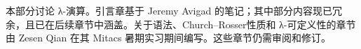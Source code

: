 \documentclass[../../include/open-logic-part]{subfiles}
\begin{document}

\begin{editorial}
本部分讨论 λ-演算。引言章基于 Jeremy Avigad 的笔记；其中部分内容现已冗余，且已在后续章节中涵盖。关于语法、Church--Rosser性质和 λ-可定义性的章节由 Zesen Qian 在其 Mitacs 暑期实习期间编写。这些章节仍需审阅和修订。
\end{editorial}





\OLEndPartHook
\end{document}
